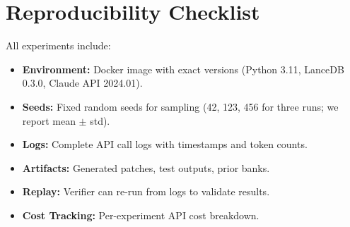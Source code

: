 \section{Reproducibility Checklist}

\label{app:reproducibility}

All experiments include:
\begin{itemize}[leftmargin=1.5em]
    \item \textbf{Environment:} Docker image with exact versions (Python 3.11,
          LanceDB 0.3.0, Claude API 2024.01).
    \item \textbf{Seeds:} Fixed random seeds for sampling (42, 123, 456 for
          three runs; we report mean $\pm$ std).
    \item \textbf{Logs:} Complete API call logs with timestamps and token counts.
    \item \textbf{Artifacts:} Generated patches, test outputs, prior banks.
    \item \textbf{Replay:} Verifier can re-run from logs to validate results.
    \item \textbf{Cost Tracking:} Per-experiment API cost breakdown.
\end{itemize}

